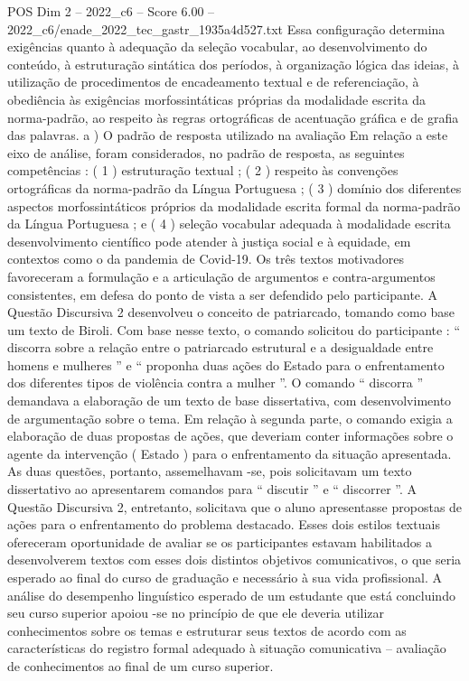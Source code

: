 \begin{textsample}{POS Dim 2 – 2022\_c6 – Score 6.00 – 2022\_c6/enade\_2022\_tec\_gastr\_1935a4d527.txt}
Essa configuração determina exigências quanto à adequação da seleção vocabular, ao desenvolvimento do conteúdo, à estruturação sintática dos períodos, à organização lógica das ideias, à utilização de procedimentos de encadeamento textual e de referenciação, à obediência às exigências morfossintáticas próprias da modalidade escrita da norma-padrão, ao respeito às regras ortográficas de acentuação gráfica e de grafia das palavras. a ) O padrão de resposta utilizado na avaliação Em relação a este eixo de análise, foram considerados, no padrão de resposta, as seguintes competências : ( 1 ) estruturação textual ; ( 2 ) respeito às convenções ortográficas da norma-padrão da Língua Portuguesa ; ( 3 ) domínio dos diferentes aspectos morfossintáticos próprios da modalidade escrita formal da norma-padrão da Língua Portuguesa ; e ( 4 ) seleção vocabular adequada à modalidade escrita desenvolvimento científico pode atender à justiça social e à equidade, em contextos como o da pandemia de Covid-19.
Os três textos motivadores favoreceram a formulação e a articulação de argumentos e contra-argumentos consistentes, em defesa do ponto de vista a ser defendido pelo participante.
A Questão Discursiva 2 desenvolveu o conceito de patriarcado, tomando como base um texto de Biroli.
Com base nesse texto, o comando solicitou do participante : “ discorra sobre a relação entre o patriarcado estrutural e a desigualdade entre homens e mulheres ” e “ proponha duas ações do Estado para o enfrentamento dos diferentes tipos de violência contra a mulher ”.
O comando “ discorra ” demandava a elaboração de um texto de base dissertativa, com desenvolvimento de argumentação sobre o tema.
Em relação à segunda parte, o comando exigia a elaboração de duas propostas de ações, que deveriam conter informações sobre o agente da intervenção ( Estado ) para o enfrentamento da situação apresentada.
As duas questões, portanto, assemelhavam -se, pois solicitavam um texto dissertativo ao apresentarem comandos para “ discutir ” e “ discorrer ”.
A Questão Discursiva 2, entretanto, solicitava que o aluno apresentasse propostas de ações para o enfrentamento do problema destacado.
Esses dois estilos textuais ofereceram oportunidade de avaliar se os participantes estavam habilitados a desenvolverem textos com esses dois distintos objetivos comunicativos, o que seria esperado ao final do curso de graduação e necessário à sua vida profissional.
A análise do desempenho linguístico esperado de um estudante que está concluindo seu curso superior apoiou -se no princípio de que ele deveria utilizar conhecimentos sobre os temas e estruturar seus textos de acordo com as características do registro formal adequado à situação comunicativa – avaliação de conhecimentos ao final de um curso superior.

\end{textsample}

